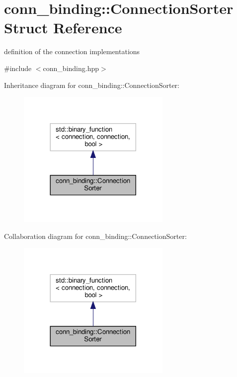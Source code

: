 \hypertarget{structconn__binding_1_1ConnectionSorter}{}\section{conn\+\_\+binding\+:\+:Connection\+Sorter Struct Reference}
\label{structconn__binding_1_1ConnectionSorter}


definition of the connection implementations  




{\ttfamily \#include $<$conn\+\_\+binding.\+hpp$>$}



Inheritance diagram for conn\+\_\+binding\+:\+:Connection\+Sorter\+:
\nopagebreak
\begin{figure}[H]
\begin{center}
\leavevmode
\includegraphics[width=209pt]{d5/d98/structconn__binding_1_1ConnectionSorter__inherit__graph}
\end{center}
\end{figure}


Collaboration diagram for conn\+\_\+binding\+:\+:Connection\+Sorter\+:
\nopagebreak
\begin{figure}[H]
\begin{center}
\leavevmode
\includegraphics[width=209pt]{d1/dbe/structconn__binding_1_1ConnectionSorter__coll__graph}
\end{center}
\end{figure}
